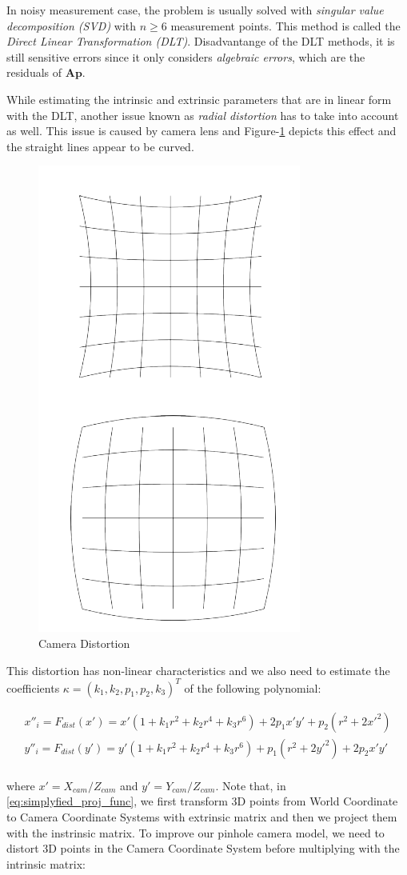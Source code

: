 \documentclass[a4paper]{report}
\numberwithin{figure}{section}
\begin{document}
In noisy measurement case, the problem is usually solved with
\textit{singular value decomposition (SVD)} with $n \geq 6$ measurement points. 
This method is called the \textit{Direct Linear Transformation (DLT)}.
Disadvantange of the DLT methods, it is still sensitive errors since 
it only considers \textit{algebraic errors}, which are the residuals of 
$\mathbf{Ap}$. 

While estimating the intrinsic and extrinsic parameters 
that are in linear form with the DLT, 
another issue known as \textit{radial distortion} 
has to take into account as well. This issue is caused by camera lens 
and Figure-\ref{fig:cam_distortion} depicts this effect and the straight lines 
appear to be curved. 

\begin{figure}[H]
	\centering
  \includegraphics[width=0.3\linewidth,natwidth=640,natheight=640]
  {fig/ref_imgs/cam_distortion.png}
  \caption{Camera Distortion}
  \label{fig:cam_distortion}
\end{figure}

This distortion has non-linear characteristics and we also 
need to estimate the coefficients 
$\kappa = (k_1, k_2, p_1, p_2, k_3)^T$ of the following polynomial:


\begin{equation}
\begin{split}
  x''_i = F_{dist}(x') = 
  x'(1+ k_1 r^2 + k_2 r^4 + k_3 r^6) + 2 p_1 x' y' + p_2 (r^2+2x'^2)\\
  y''_i = F_{dist}(y') = 
  y'(1+ k_1 r^2 + k_2 r^4 + k_3 r^6) + p_1 (r^2+2y'^2) + 2p_2 x'y'\\
\end{split}
\end{equation}

where $x' = X_{cam}/Z_{cam}$ and $y' = Y_{cam}/Z_{cam}$. 
Note that, in \ref{eq:simplyfied_proj_func}, we first transform 
3D points from World Coordinate to Camera Coordinate Systems with 
extrinsic matrix and then we project them with the instrinsic matrix. 
To improve our pinhole camera model, 
we need to distort 3D points in the Camera Coordinate System before 
multiplying with the intrinsic matrix:
\end{document}
